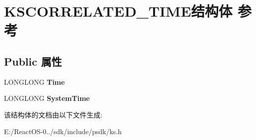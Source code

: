 \hypertarget{struct_k_s_c_o_r_r_e_l_a_t_e_d___t_i_m_e}{}\section{K\+S\+C\+O\+R\+R\+E\+L\+A\+T\+E\+D\+\_\+\+T\+I\+M\+E结构体 参考}
\label{struct_k_s_c_o_r_r_e_l_a_t_e_d___t_i_m_e}
\subsection*{Public 属性}
\begin{DoxyCompactItemize}
\item 
\mbox{\label{struct_k_s_c_o_r_r_e_l_a_t_e_d___t_i_m_e_aebe57472bf750d037da9d79101ae40de}} 
L\+O\+N\+G\+L\+O\+NG {\bfseries Time}
\item 
\mbox{\label{struct_k_s_c_o_r_r_e_l_a_t_e_d___t_i_m_e_aaa96616e901e7357a97a19daee01bb20}} 
L\+O\+N\+G\+L\+O\+NG {\bfseries System\+Time}
\end{DoxyCompactItemize}


该结构体的文档由以下文件生成\+:\begin{DoxyCompactItemize}
\item 
E\+:/\+React\+O\+S-\/0../sdk/include/psdk/ks.\+h\end{DoxyCompactItemize}

